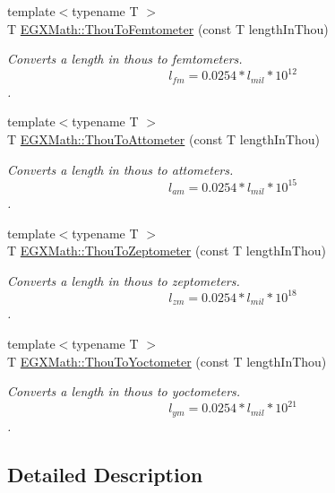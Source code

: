 \begin{DoxyCompactItemize}
{\footnotesize template$<$typename T $>$ }\\T \mbox{\hyperlink{group___e_g_x_math-_conversions-_length_conversions-_imperial-_thou-_s_i_gaecb2f2011c7b1c81a6b94cf3111cc107}{E\+G\+X\+Math\+::\+Thou\+To\+Femtometer}} (const T length\+In\+Thou)
\begin{DoxyCompactList}\small\item\em Converts a length in thous to femtometers. \[ l_{fm}=0.0254 * l_{mil} * 10^{12} \]. \end{DoxyCompactList}\item 
{\footnotesize template$<$typename T $>$ }\\T \mbox{\hyperlink{group___e_g_x_math-_conversions-_length_conversions-_imperial-_thou-_s_i_ga6e15cb5df637254290eebc91c3e2867d}{E\+G\+X\+Math\+::\+Thou\+To\+Attometer}} (const T length\+In\+Thou)
\begin{DoxyCompactList}\small\item\em Converts a length in thous to attometers. \[ l_{am}=0.0254 * l_{mil} * 10^{15} \]. \end{DoxyCompactList}\item 
{\footnotesize template$<$typename T $>$ }\\T \mbox{\hyperlink{group___e_g_x_math-_conversions-_length_conversions-_imperial-_thou-_s_i_ga496bafe1152fe3ede3021fd49289b6e5}{E\+G\+X\+Math\+::\+Thou\+To\+Zeptometer}} (const T length\+In\+Thou)
\begin{DoxyCompactList}\small\item\em Converts a length in thous to zeptometers. \[ l_{zm}=0.0254 * l_{mil} * 10^{18} \]. \end{DoxyCompactList}\item 
{\footnotesize template$<$typename T $>$ }\\T \mbox{\hyperlink{group___e_g_x_math-_conversions-_length_conversions-_imperial-_thou-_s_i_ga9d6f9fc2ae199f7d67e0eff86cc17caf}{E\+G\+X\+Math\+::\+Thou\+To\+Yoctometer}} (const T length\+In\+Thou)
\begin{DoxyCompactList}\small\item\em Converts a length in thous to yoctometers. \[ l_{ym}=0.0254 * l_{mil} * 10^{21} \]. \end{DoxyCompactList}\end{DoxyCompactItemize}


\subsection{Detailed Description}


